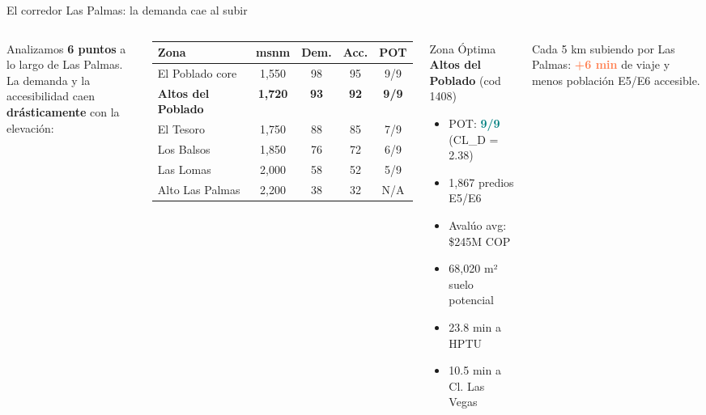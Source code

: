 \documentclass[aspectratio=169, 11pt]{beamer}
\newcommand{\highlight}[1]{\textcolor{teal}{\textbf{#1}}}
\newcommand{\danger}[1]{\textcolor{coral}{\textbf{#1}}}
\newcommand{\src}[1]{\par\vspace{2pt}{\tiny\textcolor{slate}{Fuente: #1}}}
\begin{document}
\begin{frame}{El corredor Las Palmas: la demanda cae al subir}

\begin{columns}[T]
Analizamos \textbf{6 puntos} a lo largo de Las Palmas.\\
La demanda y la accesibilidad caen \textbf{drásticamente} con la elevación:

\vspace{6pt}
{\small
\begin{tabular}{@{}lcccc@{}}
\toprule
\textbf{Zona} & \textbf{msnm} & \textbf{Dem.} & \textbf{Acc.} & \textbf{POT} \\
\midrule
\rowcolor{teal!6}
El Poblado core & 1,550 & 98 & 95 & 9/9 \\
\rowcolor{teal!15}
\textbf{Altos del Poblado} & \textbf{1,720} & \textbf{93} & \textbf{92} & \textbf{9/9} \\
\rowcolor{teal!6}
El Tesoro & 1,750 & 88 & 85 & 7/9 \\
Los Balsos & 1,850 & 76 & 72 & 6/9 \\
Las Lomas & 2,000 & 58 & 52 & 5/9 \\
\rowcolor{coral!8}
Alto Las Palmas & 2,200 & 38 & 32 & N/A \\
\bottomrule
\end{tabular}
}

\src{Catastro (bp59-rj8r), POT (3ciz-tpgr), Mapbox Matrix API}

\begin{exampleblock}{Zona Óptima}
\textbf{Altos del Poblado} (cod 1408)

\vspace{4pt}
\small
\begin{itemize}\small
  \item POT: \highlight{9/9} (CL\_D = 2.38)
  \item 1,867 predios E5/E6
  \item Avalúo avg: \$245M COP
  \item 68,020 m² suelo potencial
  \item 23.8 min a HPTU
  \item 10.5 min a Cl. Las Vegas
\end{itemize}
\end{exampleblock}

\vspace{6pt}
{\footnotesize\textcolor{slate}{Cada 5 km subiendo por Las Palmas: \danger{+6 min} de viaje y menos población E5/E6 accesible.}}
\end{columns}
\end{frame}
\end{document}

